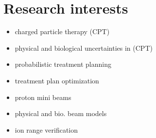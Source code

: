 \documentclass[a4paper,10pt]{article}
\begin{document}
\pagebreak


\section{Research interests}

\setlength{\columnsep}{0cm}
\begin{multicols}{2}
\begin{itemize}
  \item charged particle therapy (CPT)
  \item physical and biological uncertainties in (CPT)
  \item probabilistic treatment planning
  \item treatment plan optimization
  \item proton mini beams
  \item physical and bio. beam models
  \item ion range verification
\end{itemize}
\end{multicols}

\vspace{0.3cm}
\end{document}
